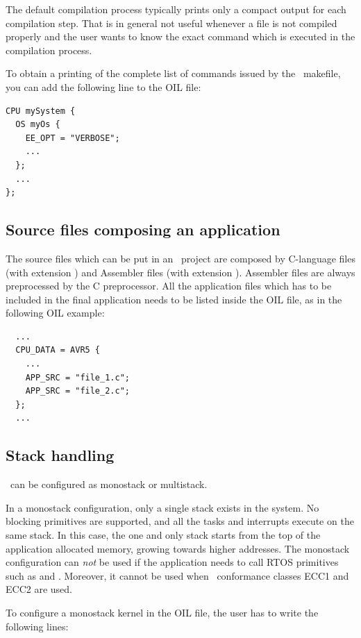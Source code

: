 The default compilation process typically prints only a compact output
for each compilation step. That is in general not useful whenever a
file is not compiled properly and the user wants to know the exact
command which is executed in the compilation process.

To obtain a printing of the complete list of commands issued by the
\ee\ makefile, you can add the following line to the OIL file:

\begin{lstlisting}
CPU mySystem {
  OS myOs {
    EE_OPT = "VERBOSE";
    ...
  };
  ...
};
\end{lstlisting}

\subsection{Source files composing an application}
The source files which can be put in an \rtd\ project are composed by
C-language files (with extension ) and Assembler files (with
extension ). Assembler files are always preprocessed by the C
preprocessor. All the application files which has to be included in
the final application needs to be listed inside the OIL file, as in
the following OIL example:

\begin{lstlisting}
  ...
  CPU_DATA = AVR5 {
    ...
    APP_SRC = "file_1.c";
    APP_SRC = "file_2.c";
  };
  ...
\end{lstlisting}




\subsection{Stack handling}
\ee\ can be configured as monostack or multistack.

In a monostack configuration, only a single stack exists in the
system. No blocking primitives are supported, and all the tasks and
interrupts execute on the same stack. In this case, the one and only
stack starts from the top of the application allocated memory, growing
towards higher addresses. The monostack configuration can {\em not} be
used if the application needs to call RTOS primitives such as
 and . Moreover, it cannot be used when \ee\
conformance classes ECC1 and ECC2 are used.

To configure a monostack kernel in the OIL file, the user has to write
the following lines:

